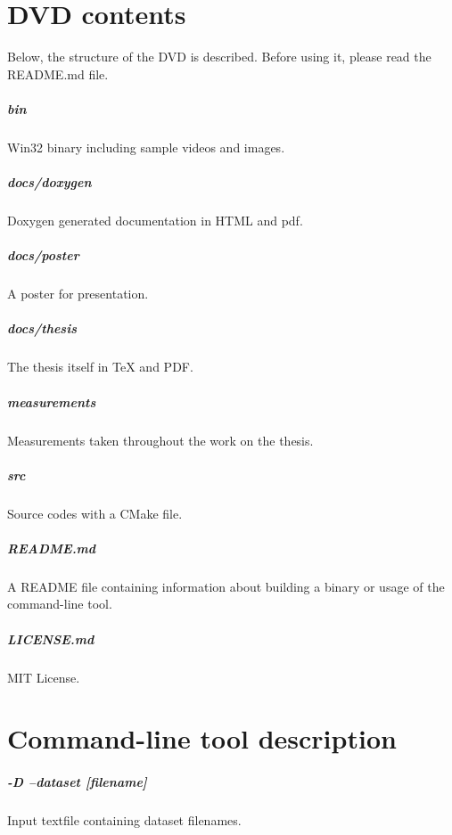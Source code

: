 \chapter{DVD contents}

Below, the structure of the DVD is described. Before using it, please read the README.md file.

\paragraph{bin} Win32 binary including sample videos and images.
\paragraph{docs/doxygen} Doxygen generated documentation in HTML and pdf.
\paragraph{docs/poster} A poster for presentation.
\paragraph{docs/thesis} The thesis itself in TeX and PDF.
\paragraph{measurements} Measurements taken throughout the work on the thesis.
\paragraph{src} Source codes with a CMake file.
\paragraph{README.md} A README file containing information about building a binary or usage of the command-line tool.
\paragraph{LICENSE.md} MIT License.

\chapter{Command-line tool description}

\paragraph{-D --dataset [filename]} Input textfile containing dataset filenames.
